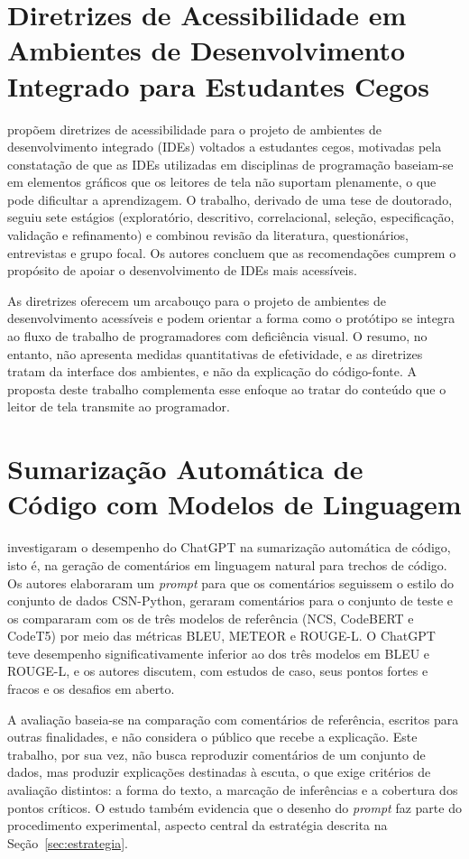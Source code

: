 \documentclass[
    12pt,                   %
    openright,              %
    oneside,                %
    a4paper,                %
    sumario=tradicional,    %
    english,                %
    brazil,                 %
    ]{abntex2}
\begin{document}
\section{Diretrizes de Acessibilidade em Ambientes de Desenvolvimento Integrado para Estudantes Cegos}

\textcite{latinoware37693} propõem diretrizes de acessibilidade para o projeto de ambientes de desenvolvimento integrado (IDEs) voltados a estudantes cegos, motivadas pela constatação de que as IDEs utilizadas em disciplinas de programação baseiam-se em elementos gráficos que os leitores de tela não suportam plenamente, o que pode dificultar a aprendizagem. O trabalho, derivado de uma tese de doutorado, seguiu sete estágios (exploratório, descritivo, correlacional, seleção, especificação, validação e refinamento) e combinou revisão da literatura, questionários, entrevistas e grupo focal. Os autores concluem que as recomendações cumprem o propósito de apoiar o desenvolvimento de IDEs mais acessíveis.

As diretrizes oferecem um arcabouço para o projeto de ambientes de desenvolvimento acessíveis e podem orientar a forma como o protótipo se integra ao fluxo de trabalho de programadores com deficiência visual. O resumo, no entanto, não apresenta medidas quantitativas de efetividade, e as diretrizes tratam da interface dos ambientes, e não da explicação do código-fonte. A proposta deste trabalho complementa esse enfoque ao tratar do conteúdo que o leitor de tela transmite ao programador.

\section{Sumarização Automática de Código com Modelos de Linguagem}

\textcite{sun2023chatgptsum} investigaram o desempenho do ChatGPT na sumarização automática de código, isto é, na geração de comentários em linguagem natural para trechos de código. Os autores elaboraram um \textit{prompt} para que os comentários seguissem o estilo do conjunto de dados CSN-Python, geraram comentários para o conjunto de teste e os compararam com os de três modelos de referência (NCS, CodeBERT e CodeT5) por meio das métricas BLEU, METEOR e ROUGE-L. O ChatGPT teve desempenho significativamente inferior ao dos três modelos em BLEU e ROUGE-L, e os autores discutem, com estudos de caso, seus pontos fortes e fracos e os desafios em aberto.

A avaliação baseia-se na comparação com comentários de referência, escritos para outras finalidades, e não considera o público que recebe a explicação. Este trabalho, por sua vez, não busca reproduzir comentários de um conjunto de dados, mas produzir explicações destinadas à escuta, o que exige critérios de avaliação distintos: a forma do texto, a marcação de inferências e a cobertura dos pontos críticos. O estudo também evidencia que o desenho do \textit{prompt} faz parte do procedimento experimental, aspecto central da estratégia descrita na Seção~\ref{sec:estrategia}.
\end{document}
